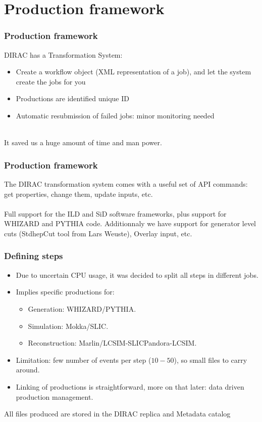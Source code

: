 \documentclass{beamer}
\begin{document}
\section{Production framework}
\begin{frame}
	\frametitle{Production framework}
DIRAC has a Transformation System:
\begin{itemize}
\item  Create a workflow object (XML representation of a job), and let the system create the jobs for you
\item Productions are identified unique ID
\item Automatic resubmission of failed jobs: minor monitoring needed
\end{itemize}
~\\
It \alert{saved us a huge amount of time and man power}.
\end{frame}

\begin{frame}
\frametitle{Production framework}
The DIRAC transformation system comes with a useful set of API commands: get properties, change them, update inputs, etc.\\
~\\
\alert{Full support for the ILD and SiD software frameworks}, plus support for WHIZARD and PYTHIA code. Additionnaly we have support for generator level cuts (StdhepCut tool from Lars Weuste), Overlay input, etc.~\\

\end{frame}

\begin{frame}
\frametitle{Defining steps}
\begin{itemize}
\item Due to uncertain CPU usage, it was decided to split all steps in different jobs.
\item Implies specific productions for:
\begin{itemize}
\item Generation: WHIZARD/PYTHIA.
\item Simulation: Mokka/SLIC.
\item Reconstruction: Marlin/LCSIM-SLICPandora-LCSIM.
\end{itemize}
\item Limitation: few number of events per step ($10-50$), so small files to carry around.
\item Linking of productions is straightforward, more on that later: \alert{data driven production management}.
\end{itemize}
All files produced are stored in the DIRAC replica and Metadata catalog
\end{frame}
\end{document}
